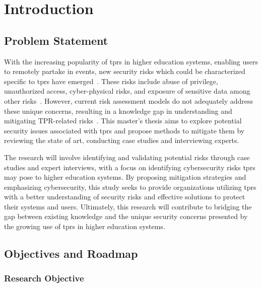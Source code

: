 
\newpage
\section{Introduction}


\subsection{Problem Statement}

With the increasing popularity of \ac{tprs} in higher education systems, enabling users to remotely partake in events, new security risks
which could be characterized specific to \ac{tprs} have emerged~\cite{acceptance-telepresence-robots-2022,
  cyber_security_issues_in_robotics_2021,robotics_cyber_security_2022,robot_security_review_2022}.
These risks include abuse of privilege, unauthorized access, cyber-physical risks, and exposure of sensitive data among other risks~\cite[
  120]{robotics_cyber_security_2022}.
However, current risk assessment models do not adequately address these unique concerns, resulting in a knowledge gap in understanding 
and mitigating TPR-related risks~\cite[]{robotics_cyber_security_2022}.
This master's thesis aims to explore potential security issues associated with \ac{tprs} and propose methods to mitigate them by
reviewing the state of art, conducting case studies and interviewing experts.

The research will involve identifying and validating potential risks through case studies and expert interviews, with a focus on identifying
cybersecurity risks \ac{tprs} may pose to higher education systems.
By proposing mitigation strategies and emphasizing cybersecurity, this study seeks to provide organizations utilizing \ac{tprs} with a
better
understanding of security risks and effective solutions to protect their systems and users.
Ultimately, this research will contribute to bridging the gap between existing knowledge and the unique security concerns presented by the
growing use of \ac{tprs} in higher education systems.

\subsection{Objectives and Roadmap}\label{subsec:objectives-and-roadmap}


\subsubsection{Research Objective}

